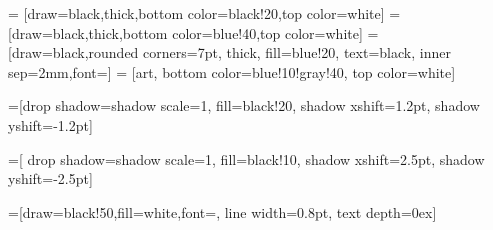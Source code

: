 \newcommand{\kwdecl}{\upshape\ttfamily}
\newcommand{\mcode}[1]{{\texttt{#1}}} %

\newcommand{\kwlbrace} {\kw{\{\,}}
\newcommand{\kwrbrace} {\kw{\}}}
\newcommand{\kwlparen} {\kw{(\,}}
\newcommand{\kwrparen} {\kw{)}}
\newcommand{\kwdot} {\kw{.}}

\newcommand{\kwassign} {$\,\kw{=}\,$}
\newcommand{\kwsemi} {$\,\kw{;}\,$}
\newcommand{\kwbar} {$\,\kw{|}\,$}
\newcommand{\kwcomma} {$\,\kw{,}\,$}
\newcommand{\kwlt} {$\,\kw{<}$}
\newcommand{\kwgt} {$\kw{>}\,$}
\newcommand{\kwclass} {\kw{class}}
\newcommand{\kwinterface} {\kw{interface}}
\newcommand{\kwextends} {\kw{extends}}
\newcommand{\kwdata} {\kw{data}}
\newcommand{\kwdef} {\kw{def}}
\newcommand{\kwimplements} {\kw{implements}}
\newcommand{\kwwhile} {\kw{while}}
\newcommand{\kwassert} {\kw{assert}}
\newcommand{\kwreturn} {\kw{return}}
\newcommand{\kwfut} {\kw{Fut}}
\newcommand{\kwskip} {\kw{skip}}
\newcommand{\kwget} {\kw{get}}
\newcommand{\kwnull} {\kw{null}}
\newcommand{\kwawait} {\kw{await}}
\newcommand{\kwif} {\kw{if}}
\newcommand{\kwthen} {\kw{then}}
\newcommand{\kwelse} {\kw{else}}
\newcommand{\kwsuspend} {\kw{suspend}}
\newcommand{\kwnew} {\kw{new}}
\newcommand{\kwthis} {\kw{this}}
\newcommand{\kwcase} {\kw{case}}
\newcommand{\kwlet} {\kw{let}}
\newcommand{\kwin} {\kw{in}}
\newcommand{\kwcog} {\kw{cog}}
\newcommand{\kwtype} {\kw{type}}
\newcommand{\kwguardand} {\kw{\&}}
\newcommand{\kwbang} {\kw{!}}



 = [draw=black,thick,bottom color=black!20,top color=white]
 = [draw=black,thick,bottom color=blue!40,top color=white]
 = [draw=black,rounded corners=7pt, thick,
  fill=blue!20, text=black, inner sep=2mm,font=\sffamily]
= [art, bottom color=blue!10!gray!40, top color=white]




\newcommand{\diagramfont}{\sffamily}
=[drop shadow={shadow scale=1, fill=black!20,
shadow xshift=1.2pt, shadow yshift=-1.2pt}]

=[
drop shadow={shadow scale=1, fill=black!10,
shadow xshift=2.5pt, shadow yshift=-2.5pt}]

=[draw=black!50,fill=white,font=\diagramfont,
line width=0.8pt, text depth=0ex]

